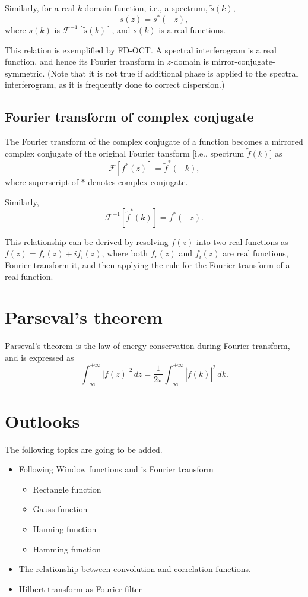 \documentclass[a4paper]{article}
\newcommand{\intinfty}{\int^{+\infty}_{-\infty}\xspace}
\newcommand{\abs}[1]{\left|{#1}\right|\xspace}
\newcommand{\ftf}[1]{{\mathcal{F}\left[#1\right]\xspace}}
\newcommand{\iftf}[1]{{\mathcal{F}^{-1}\left[#1\right]\xspace}}
\newcommand{\ftt}[1]{{\tilde{#1}\xspace}}
\begin{document}
Similarly, for a real $k$-domain function, i.e., a spectrum, $\ftt{s}(k)$,
\begin{equation}
	s(z) = s^*(-z),
\end{equation}
where $s(k)$ is $\iftf{\ftt{s}(k)}$, and $s(k)$ is a real functions.

This relation is exemplified by FD-OCT.
A spectral interferogram is a real function, and hence its Fourier transform in $z$-domain is mirror-conjugate-symmetric.
(Note that it is not true if additional phase is applied to the spectral interferogram, as it is frequently done to correct dispersion.)

\subsection{Fourier transform of complex conjugate}
The Fourier transform of the complex conjugate of a function becomes a mirrored complex conjugate of the original Fourier tansform [i.e., spectrum $\ftt{f}(k)$] as
\begin{equation}
	\ftf{f^*(z)} = \ftt{f}^*(-k),
\end{equation}
where superscript of $*$ denotes complex conjugate.

Similarly,
\begin{equation}
	\iftf{\ftt{f}^*(k)} = f^*(-z).
\end{equation}

This relationship can be derived by resolving $f(z)$ into two real functions as $f(z) = f_r(z) + i f_i(z)$, where both $f_r(z)$ and $f_i(z)$ are real functions, Fourier transform it, and then applying the rule for the Fourier transform of a real function.

\section{Parseval’s theorem}
Parseval’s theorem is the law of energy conservation during Fourier transform, and is expressed as 
\begin{equation}
	\intinfty \abs{f(z)}^2 \, dz
	= \frac{1}{2\pi} \intinfty \abs{\ftt{f}(k)}^2  \, dk.
\end{equation}

\section*{Outlooks}
The following topics are going to be added.
\begin{itemize}
	\item Following Window functions and is Fourier transform
	\begin{itemize}
		\item Rectangle function
		\item Gauss function
		\item Hanning function
		\item Hamming function
	\end{itemize}
	\item The relationship between convolution and correlation functions.
	\item Hilbert transform as Fourier filter
\end{itemize}
\end{document}
